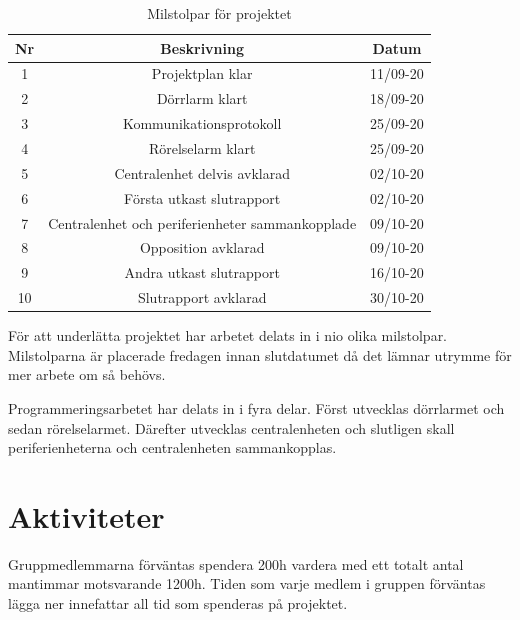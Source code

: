 \documentclass[a4paper]{article}
\begin{document}
\begin{table}[H]
    \centering
        \begin{tabular}{ |c|c|c| }\hline
            Nr & Beskrivning & Datum \\\hline \hline
            1 & Projektplan klar & 11/09-20 \\\hline
            2 & Dörrlarm klart & 18/09-20 \\\hline
            3 & Kommunikationsprotokoll & 25/09-20 \\\hline
            4 & Rörelselarm klart & 25/09-20 \\\hline
            5 & Centralenhet delvis avklarad & 02/10-20 \\\hline
            6 & Första utkast slutrapport & 02/10-20 \\\hline
            7 & Centralenhet och periferienheter sammankopplade & 09/10-20 \\\hline
            8 & Opposition avklarad & 09/10-20 \\\hline
            9 & Andra utkast slutrapport & 16/10-20 \\\hline
            10 & Slutrapport avklarad & 30/10-20 \\\hline
        \end{tabular}
        \caption{Milstolpar för projektet}
        \label{table:milstolpar}
\end{table}

För att underlätta projektet har arbetet delats in i nio olika milstolpar. Milstolparna är placerade fredagen innan slutdatumet då det lämnar utrymme för mer arbete om så behövs.

Programmeringsarbetet har delats in i fyra delar. Först utvecklas dörrlarmet och sedan rörelselarmet. Därefter utvecklas centralenheten och slutligen skall periferienheterna och centralenheten sammankopplas.

\section{Aktiviteter}

Gruppmedlemmarna förväntas spendera 200h vardera med ett totalt antal mantimmar motsvarande 1200h. Tiden som varje medlem i gruppen förväntas lägga ner innefattar all tid som spenderas på projektet.
\end{document}
